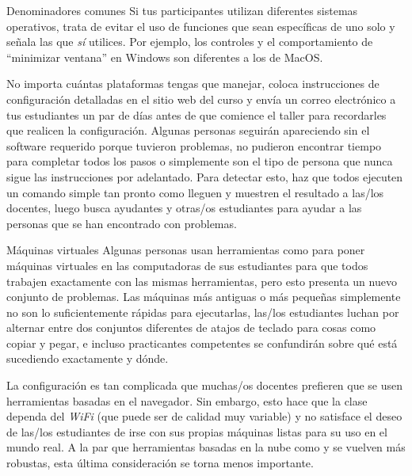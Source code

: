 \begin{aside}{Denominadores comunes}
  Si tus participantes utilizan diferentes sistemas operativos,
  trata de evitar el uso de funciones que sean específicas de uno solo
  y señala las que \emph{sí} utilices.
  Por ejemplo,
  los controles y el comportamiento de ``minimizar ventana'' en Windows son diferentes
  a los de MacOS.
\end{aside}

No importa cuántas plataformas tengas que manejar,
coloca instrucciones de configuración detalladas en el sitio web del curso
y envía un correo electrónico a tus estudiantes un par de días antes de que comience el taller
para recordarles que realicen la configuración.
Algunas personas seguirán apareciendo sin el software requerido porque
tuvieron problemas,
no pudieron encontrar tiempo para completar todos los pasos
o simplemente son el tipo de persona que nunca sigue las instrucciones por adelantado.
Para detectar esto,
haz que todos ejecuten un comando simple tan pronto como lleguen
y muestren el resultado a las/los docentes,
luego busca ayudantes y otras/os estudiantes
para ayudar a las personas que se han encontrado con problemas.

\begin{aside}{Máquinas virtuales}
  Algunas personas usan herramientas como 
  para poner máquinas virtuales en las computadoras de sus estudiantes
  para que todos trabajen exactamente con las mismas herramientas,
  pero esto presenta un nuevo conjunto de problemas.
  Las máquinas más antiguas o más pequeñas simplemente no son lo suficientemente rápidas para ejecutarlas,
  las/los estudiantes luchan por alternar
  entre dos conjuntos diferentes de atajos de teclado para cosas como copiar y pegar,
  e incluso practicantes competentes se confundirán sobre qué está sucediendo exactamente y dónde.
\end{aside}

La configuración es tan complicada que
muchas/os docentes prefieren que se usen herramientas basadas en el navegador.
Sin embargo,
esto hace que la clase dependa del \emph{WiFi}
(que puede ser de calidad muy variable)
y no satisface el deseo de las/los estudiantes de irse con sus propias máquinas listas para su uso en el mundo real.
A la par que herramientas basadas en la nube como 
y  se vuelven más robustas,
esta última consideración se torna menos importante.

